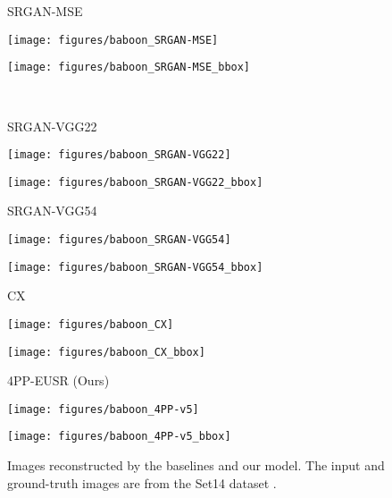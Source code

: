 \documentclass[runningheads]{llncs}
\begin{document}
\begin{figure*}[]
\begin{minipage}[b]{0.24\linewidth}
	\end{minipage}
	\begin{minipage}[b]{0.24\linewidth}
		\centering
		\centerline{\scriptsize{SRGAN-MSE}}\medskip
		\centerline{\texttt{[image: figures/baboon\_SRGAN-MSE]}}\smallskip
		\centerline{\texttt{[image: figures/baboon\_SRGAN-MSE\_bbox]}}
	\end{minipage}
	\medskip \\ \medskip
	\begin{minipage}[b]{0.24\linewidth}
		\centering
		\centerline{\scriptsize{SRGAN-VGG22}}\medskip
		\centerline{\texttt{[image: figures/baboon\_SRGAN-VGG22]}}\smallskip
		\centerline{\texttt{[image: figures/baboon\_SRGAN-VGG22\_bbox]}}
	\end{minipage}
	\begin{minipage}[b]{0.24\linewidth}
		\centering
		\centerline{\scriptsize{SRGAN-VGG54}}\medskip
		\centerline{\texttt{[image: figures/baboon\_SRGAN-VGG54]}}\smallskip
		\centerline{\texttt{[image: figures/baboon\_SRGAN-VGG54\_bbox]}}
	\end{minipage}
	\begin{minipage}[b]{0.24\linewidth}
		\centering
		\centerline{\scriptsize{CX}}\medskip
		\centerline{\texttt{[image: figures/baboon\_CX]}}\smallskip
		\centerline{\texttt{[image: figures/baboon\_CX\_bbox]}}
	\end{minipage}
	\begin{minipage}[b]{0.24\linewidth}
		\centering
		\centerline{\scriptsize{4PP-EUSR (Ours)}}\medskip
		\centerline{\texttt{[image: figures/baboon\_4PP-v5]}}\smallskip
		\centerline{\texttt{[image: figures/baboon\_4PP-v5\_bbox]}}
	\end{minipage}
	\caption{Images reconstructed by the baselines and our model. The input and ground-truth images are from the Set14 dataset \cite{zeyde2010single}.}
	\label{fig:result_baseline_comparison}
\end{figure*}
\end{document}
